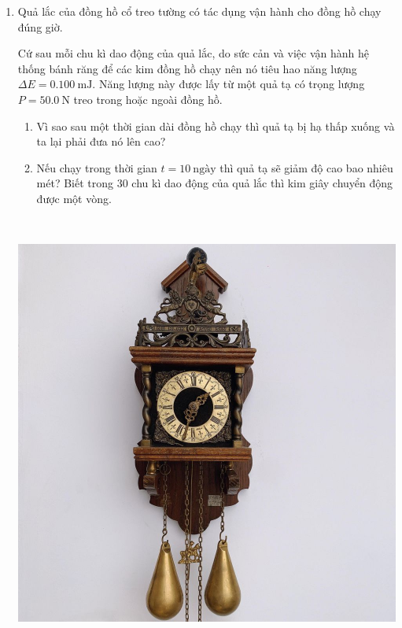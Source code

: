 \begin{enumerate}[label=\bfseries Bài \arabic*:]
{}
\item Quả lắc của đồng hồ cổ treo tường có tác dụng vận hành cho đồng hồ chạy đúng giờ.\\
\begin{minipage}[l]{0.55\textwidth}
	Cứ sau mỗi chu kì dao động của quả lắc, do sức cản và việc vận hành hệ thống bánh răng để các kim đồng hồ chạy nên nó tiêu hao năng lượng $\Delta E=\SI{0.100}{\milli\joule}$. Năng lượng này được lấy từ một quả tạ có trọng lượng $P=\SI{50.0}{\newton}$ treo trong hoặc ngoài đồng hồ.
	\begin{enumerate}[label=\alph*)]
		\item Vì sao sau một thời gian dài đồng hồ chạy thì quả tạ bị hạ thấp xuống và ta lại phải đưa nó lên cao?
		\item Nếu chạy trong thời gian $t=10\ \text{ngày}$ thì quả tạ sẽ giảm độ cao bao nhiêu mét? Biết trong 30 chu kì dao động của quả lắc thì kim giây chuyển động được một vòng.
	\end{enumerate}
\end{minipage}
\begin{minipage}[c]{0.05\textwidth}
	\
\end{minipage}
\begin{minipage}[l]{0.4\textwidth}
	\begin{center}
		\includegraphics[width=0.5\linewidth]{../figs/D11-2-2}
	\end{center}
\end{minipage}
\end{enumerate}
